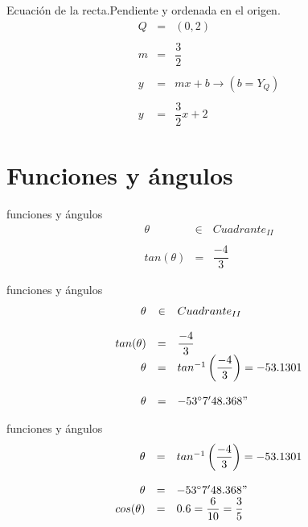 \documentclass{beamer}
\begin{document}
\begin{frame}{Ecuación de la recta.}{Pendiente y ordenada en el origen.}
\begin{equation}
\begin{array}{rcl}
Q & = & (0, 2)\\
\\
m & = & \dfrac{3}{2}\\
\\
y & = & mx + b \rightarrow (b = Y_Q)\\
\\
y & = & \dfrac{3}{2}x + 2
\end{array}
\end{equation}
\end{frame}

\section{Funciones y ángulos}

\begin{frame}{funciones y ángulos}
\begin{equation}
\begin{array}{rcl}
\theta & \in & Cuadrante_{II}\\
\\
tan(\theta) & = & \dfrac{-4}{3}
\end{array}
\end{equation}
\end{frame}

\begin{frame}{funciones y ángulos}
\begin{equation}
\begin{array}{rcl}
\theta & \in & Cuadrante_{II}\\
\\
tan(\theta) & = & \dfrac{-4}{3}\\
\theta & = & tan^{-1}\left(\dfrac{-4}{3}\right) = -53.1301\\
\\
\theta & = & -53^\circ 7 ' 48.368"
\\
\end{array}
\end{equation}
\end{frame}

\begin{frame}{funciones y ángulos}
\begin{equation}
\begin{array}{rcl}
\theta & = & tan^{-1}\left(\dfrac{-4}{3}\right) = -53.1301\\
\\
\theta & = & -53^\circ 7 ' 48.368"
\\
cos(\theta) & = & 0.6 = \dfrac{6}{10} = \dfrac{3}{5}
\end{array}
\end{equation}
\end{frame}
\end{document}
